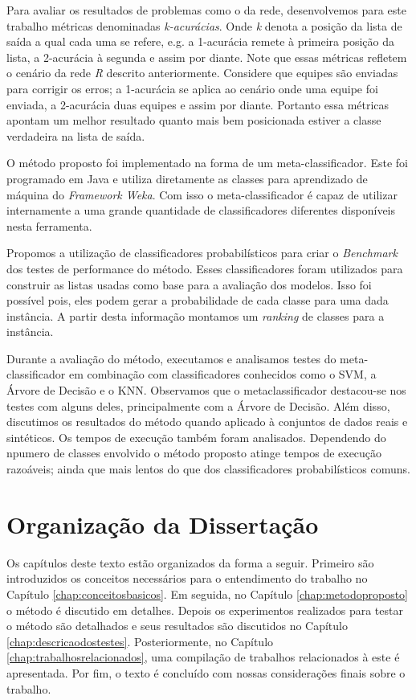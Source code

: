 Para avaliar os resultados de problemas como o da rede, desenvolvemos para este trabalho métricas denominadas \textit{k-acurácias}.
Onde \textit{k} denota a posição da lista de saída a qual cada uma se refere, e.g. a 1-acurácia remete à primeira posição da lista, a 2-acurácia à segunda e assim por diante.
Note que essas métricas refletem o cenário da rede \textit{R} descrito anteriormente.
Considere que equipes são enviadas para corrigir os erros; a 1-acurácia se aplica ao cenário onde uma equipe foi enviada, a 2-acurácia duas equipes e assim por diante.
Portanto essa métricas apontam um melhor resultado quanto mais bem posicionada estiver a classe verdadeira na lista de saída.

O método proposto foi implementado na forma de um meta-classificador.
Este foi programado em Java e utiliza diretamente as classes para aprendizado de máquina do \textit{Framework Weka}.
Com isso o meta-classificador é capaz de utilizar internamente a uma grande quantidade de classificadores diferentes disponíveis nesta ferramenta.

Propomos a utilização de classificadores probabilísticos para criar o \textit{Benchmark} dos testes de performance do método. 
Esses classificadores foram utilizados para construir as listas usadas como base para a avaliação dos modelos.
Isso foi possível pois, eles podem gerar a probabilidade de cada classe para uma dada instância.
A partir desta informação montamos um \textit{ranking} de classes para a instância.

Durante a avaliação do método, executamos e analisamos testes do meta-classificador em combinação com classificadores conhecidos como o SVM, a Árvore de Decisão e o KNN.
Observamos que o metaclassificador destacou-se nos testes com alguns deles, principalmente com a Árvore de Decisão.
Além disso, discutimos os resultados do método quando aplicado à conjuntos de dados reais e sintéticos.
Os tempos de execução também foram analisados.
Dependendo do npumero de classes envolvido o método proposto atinge tempos de execução razoáveis; ainda que mais lentos do que dos classificadores probabilísticos comuns.

\section{Organização da Dissertação}

Os capítulos deste texto estão organizados da forma a seguir.
Primeiro são introduzidos os conceitos necessários para o entendimento do trabalho no Capítulo \ref{chap:conceitosbasicos}.
Em seguida, no Capítulo \ref{chap:metodoproposto} o método é discutido em detalhes.
Depois os experimentos realizados para testar o método são detalhados e seus resultados são discutidos no Capítulo \ref{chap:descricaodostestes}.
Posteriormente, no Capítulo \ref{chap:trabalhosrelacionados}, uma compilação de trabalhos relacionados à este é apresentada.
Por fim, o texto é concluído com nossas considerações finais sobre o trabalho.
